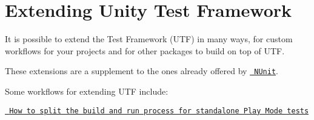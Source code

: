 \chapter{Extending Unity Test Framework}
\hypertarget{md__library_2_package_cache_2com_8unity_8test-framework_0d1_81_833_2_documentation_0i_2extending}{}\label{md__library_2_package_cache_2com_8unity_8test-framework_0d1_81_833_2_documentation_0i_2extending}
\label{md__library_2_package_cache_2com_8unity_8test-framework_0d1_81_833_2_documentation_0i_2extending_autotoc_md543}%
%
It is possible to extend the  Test Framework (UTF) in many ways, for custom workflows for your projects and for other packages to build on top of UTF.

These extensions are a supplement to the ones already offered by \href{https://github.com/nunit/docs/wiki/Framework-Extensibility}{\texttt{ NUnit}}.

Some workflows for extending UTF include\+:
\begin{DoxyItemize}
\item \href{./reference-attribute-testplayerbuildmodifier.md\#split-build-and-run-for-player-mode-tests}{\texttt{ How to split the build and run process for standalone Play Mode tests}}
\item {}
\item {}
\item {}  
\end{DoxyItemize}
